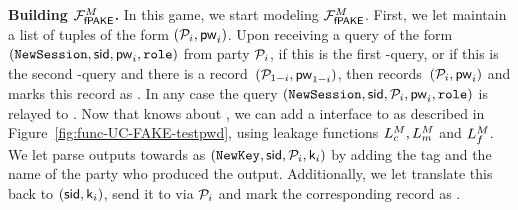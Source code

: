 \begin{games}
%   

\textbf{Building $\mathcal{F}_\textsf{fPAKE}^M$.} In this game, we start modeling $\mathcal{F}_\textsf{fPAKE}^M$.
First, we let \Func maintain a list of tuples of the form $(\mathcal{P}_{i},\mathsf{pw}_{i})$.
Upon receiving a query of the form $(\texttt{NewSession},\mathsf{sid},\mathsf{pw}_{i},\texttt{role})$ from party $\mathcal{P}_{i}$, if this is the first \NewSession-query, or if this is the second \NewSession-query and there is a record~$(\mathcal{P}_{1-i},\mathsf{pw}_{1-i})$, then \Func records~$(\mathcal{P}_{i},\mathsf{pw}_{i})$ and marks this record  as . In any case the query $(\texttt{NewSession},\mathsf{sid},\mathcal{P}_{i},\mathsf{pw}_{i},\texttt{role})$ is relayed to \Sim. Now that \Func knows about \passwords, we can add a \TestPwd interface to \Func as described in Figure~\ref{fig:func-UC-FAKE-testpwd}, using leakage functions $L_{c}^M, L_{m}^M$ and $L_{f}^M$. We let \Sim parse outputs towards \Func as $(\texttt{NewKey},\mathsf{sid},\mathcal{P}_{i},\mathsf{k}_{i})$ by adding the \NewKey tag and the name of the party who produced the output. Additionally, we let \Func translate this back to $(\mathsf{sid},\mathsf{k}_{i})$, send it to \Env via $\mathcal{P}_{i}$ and mark the corresponding record as .


\end{games}
